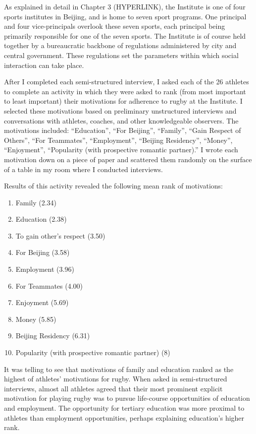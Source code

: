 \begin{CJK}{UTF8}{gbsn}
As explained in detail in Chapter 3 (HYPERLINK), the Institute is one
of four sports institutes in Beijing, and is home to seven sport programs.  One principal and four vice-principals overlook these seven sports, each principal being primarily responsible for one of the seven sports.  The Institute is of course held together by a bureaucratic backbone of regulations administered by city and central government.  These regulations set the parameters within which social interaction can take place.

After I completed each semi-structured interview, I asked each of the 26 athletes to complete an activity in which they were asked to rank (from most important to least important) their motivations for adherence to rugby at the Institute.  I selected these motivations based on preliminary unstructured interviews and conversations with athletes, coaches, and other knowledgeable observers.  The motivations included: ``Education'', ``For Beijing'', ``Family'', ``Gain Respect of Others'', ``For Teammates'', ``Employment'', ``Beijing Residency'', ``Money'', ``Enjoyment'', ``Popularity (with prospective romantic partner).'' I wrote each motivation down on a piece of paper and scattered them randomly on the surface of a table in my room where I conducted interviews.

Results of this activity revealed the following mean rank of motivations:

  \begin{enumerate}
    \item Family (2.34)
    \item Education (2.38)
    \item To gain other's respect (3.50)
    \item For Beijing (3.58)
    \item Employment (3.96)
    \item For Teammates (4.00)
    \item Enjoyment (5.69)
    \item Money (5.85)
    \item Beijing Residency (6.31)
    \item Popularity (with prospective romantic partner) (8)
  \end{enumerate}

It was telling to see that motivations of family and education ranked as the highest of athletes' motivations for rugby.  When asked in semi-structured interviews, almost all athletes agreed that their most prominent explicit motivation for playing rugby was to pursue life-course opportunities of education and employment. The opportunity for tertiary education was more proximal to athletes than employment opportunities, perhaps explaining education's higher rank.


\end{CJK}
